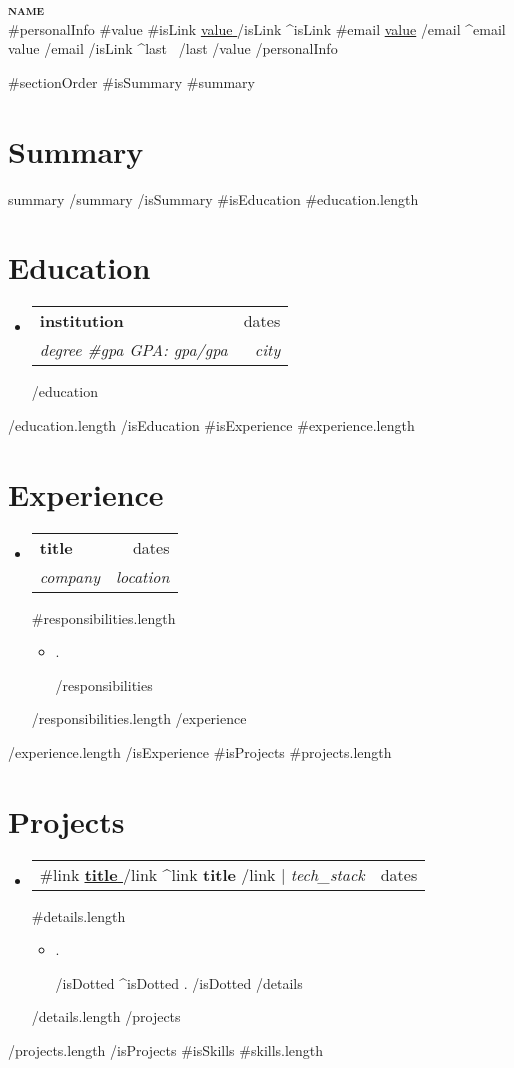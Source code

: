 \documentclass[letterpaper,11pt]{article}
\newcommand{\resumeDottedItem}[1]{
  \item\small{
    {#1 \vspace{-2pt}}
  }
}
\newcommand{\resumeParagraphItem}[1]{\small{
  {#1 \vspace{-2pt}}
}}
\newcommand{\resumeSubheading}[4]{
  \vspace{-2pt}\item
    \begin{tabularx}{\textwidth}{Xr}
      \textbf{#1} & #2 \\
      \textit{\small#3} & \textit{\small #4} \\
    \end{tabularx}\vspace{-6pt}
}
\newcommand{\resumeProjectHeading}[2]{
  \item
    \begin{tabularx}{\textwidth}{Xr}
      \small #1 & #2 \\
    \end{tabularx}\vspace{-6pt}
}
\newcommand{\resumeSubHeadingListStart}{
  \begin{itemize}[leftmargin=0.15in, label={}, itemsep=3pt, parsep=0pt, topsep=0pt]
}
\newcommand{\resumeSubHeadingListEnd}{\end{itemize}}
\newcommand{\resumeItemListStart}{
  \begin{itemize}[itemsep=2pt, parsep=0pt, topsep=0pt]
}
\newcommand{\resumeItemListEnd}{\end{itemize}\vspace{-8pt}}
\begin{document}
\begin{center}
    \textbf{\Huge \scshape {{name}}} \\ \vspace{1pt}
    \small
    {{#personalInfo}}
      {{#value}}
        {{#isLink}}
          \href{ {{{link}}} }{ \underline{ {{value}} } }
        {{/isLink}}
        {{^isLink}}
          {{#email}}
            \underline{{{value}}}
          {{/email}}
          {{^email}}
            {{value}}
          {{/email}}
        {{/isLink}}
        {{^last}} \textbar\ {{/last}}
      {{/value}}
    {{/personalInfo}}
\end{center}

{{#sectionOrder}}
  {{#isSummary}}
    {{#summary}}
      \section{Summary}
      {{summary}}
    {{/summary}}
  {{/isSummary}}
  {{#isEducation}}
    {{#education.length}}
      \section{Education}
      \resumeSubHeadingListStart
        {{#education}}
          \resumeSubheading
            { {{institution}} }{ {{dates}} }
            { {{degree}} {{#gpa}} GPA: {{gpa}}{{/gpa}} }{ {{city}} }
        {{/education}}
      \resumeSubHeadingListEnd
    {{/education.length}}
  {{/isEducation}}
  {{#isExperience}}
    {{#experience.length}}
      \section{Experience}
      \resumeSubHeadingListStart
        {{#experience}}
          \resumeSubheading
            { {{title}} }{ {{dates}} }
            { {{company}} }{ {{location}} }
            {{#responsibilities.length}}
            \resumeItemListStart
              {{#responsibilities}}
                \resumeDottedItem{ {{.}} }
              {{/responsibilities}}
            \resumeItemListEnd
            {{/responsibilities.length}}
        {{/experience}}
      \resumeSubHeadingListEnd
    {{/experience.length}}
  {{/isExperience}}
  {{#isProjects}}
    {{#projects.length}}
      \section{Projects}
      \resumeSubHeadingListStart
        {{#projects}}
          \resumeProjectHeading
            { {{#link}} \href{ {{{link}}} }{ \underline{\textbf{ {{{title}}} }} } {{/link}} {{^link}} \textbf{ {{{title}}} } {{/link}} $|$ \emph{ {{{tech_stack}}} } }{ {{{dates}}} }
            {{#details.length}}
            \resumeItemListStart
              {{#details}}
                {{#isDotted}}
                  \resumeDottedItem{ {{{.}}} }
                {{/isDotted}}
                {{^isDotted}}
                  \resumeParagraphItem{ {{{.}}} }
                {{/isDotted}}
              {{/details}}
            \resumeItemListEnd
            {{/details.length}}
        {{/projects}}
      \resumeSubHeadingListEnd
    {{/projects.length}}
  {{/isProjects}}
  {{#isSkills}}
    {{#skills.length}}
\end{document}
